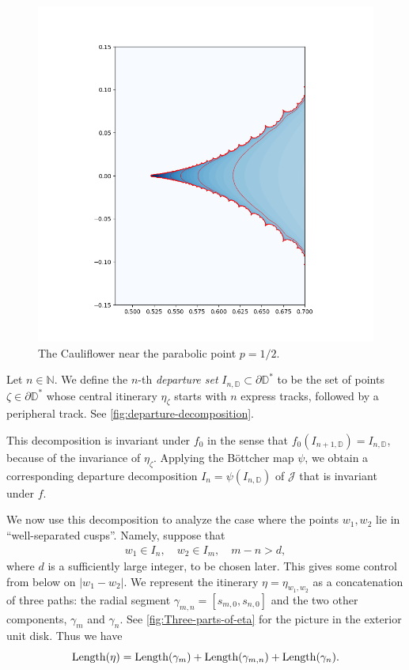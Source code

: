 \begin{figure}
    \centering
    \includegraphics[width=\textwidth]{figures/cauliflower_equipotentials2.png}
    \caption{The Cauliflower near the parabolic point $p=1/2$.}
    \label{fig:my_figure}
\end{figure}

\begin{definition}

Let $n \in \mathbb N$. We define the $n$-th \emph{departure set} $I_{n, \mathbb D} \subset \partial \mathbb D ^*$ to be the set of points $\zeta \in \partial \mathbb D^*$ whose central itinerary $\eta_{\zeta}$ starts with $n$ express tracks, followed by a peripheral track.
See \cref{fig:departure-decomposition}.
\end{definition}

This decomposition is invariant under $f_0$ in the sense that $f_0(I_{n+1, \mathbb D})=I_{n, \mathbb D}$, because of the invariance of $\eta _\zeta$.
Applying the Böttcher map $\psi$, we obtain a corresponding departure decomposition $I_n = \psi(I_{n, \mathbb D})$ of $\mathcal J$ that is invariant under $f$.

We now use this decomposition to analyze the case where the points $w_1,w_2$ lie in ``well-separated cusps''. Namely, suppose that
\begin{align} \label{parabolic separation}
	w_1 \in I_n, \quad w_2 \in I_m, \quad m-n > d,
\end{align}
where $d$ is a sufficiently large integer, to be chosen later. 
This gives some control from below on $|w_1-w_2|$. 
We represent the itinerary $\eta=\eta_{w_1,w_2}$ as a concatenation of three paths: the radial segment $\gamma_{m,n}=[s_{m,0},s_{n,0}]$ and the two other components, $\gamma _m$ and $\gamma_n$. See \cref{fig:Three-parts-of-eta} for the picture in the exterior unit disk.
Thus we have
\begin{equation}
	\operatorname{Length}(\eta)=\operatorname{Length}(\gamma_m)+\operatorname{Length}(\gamma_{m,n})+\operatorname{Length}(\gamma_n).
\end{equation}

